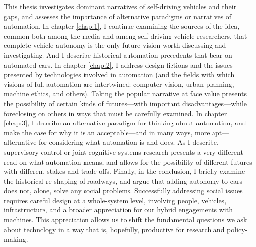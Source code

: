







This thesis investigates dominant narratives of
self-driving vehicles and their gaps, and assesses the importance of
alternative paradigms or narratives of automation. In chapter \ref{chap:1}, I continue examining
the sources of the idea, common both among the media and among
self-driving vehicle researchers, that complete vehicle autonomy is
the only future vision worth discussing and investigating. And I
describe historical automation precedents that bear on automated cars. In chapter
\ref{chap:2}, I address design fictions and the issues presented by technologies involved in
automation (and the fields with which visions of full automation are
intertwined: computer vision, urban planning, machine ethics, and
others). Taking the popular narrative at face value presents the
possibility of certain kinds of futures---with important
disadvantages---while foreclosing on others in ways that must be
carefully examined. In chapter \ref{chap:3}, I
describe an alternative paradigm for thinking about automation, and
make the case for why it is an acceptable---and in
many ways, more apt---alternative for considering what automation is
and does. As I describe, supervisory control or joint-cognitive
systems research presents a very
different read on what automation means, and allows for the possibility of different futures with
different stakes and trade-offs. Finally, in the conclusion, I briefly examine the
historical re-shaping of roadways, and argue that adding autonomy to cars does not,
alone, solve any social problems. Successfully addressing social
issues requires careful design at a whole-system level, involving
people, vehicles, infrastructure, and a broader appreciation for our hybrid
engagements with machines. This appreciation allows us to shift the fundamental
questions we ask about technology in a way that is, hopefully,
productive for research and policy-making.

